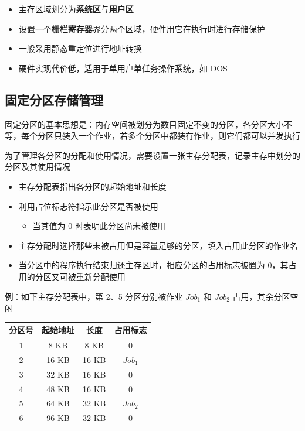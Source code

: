 \documentclass[cs4size,a4paper,10pt]{ctexart}
\begin{document}
	\begin{itemize}
		\item 主存区域划分为\textbf{系统区}与\textbf{用户区}
		\item 设置一个\textbf{栅栏寄存器}界分两个区域，硬件用它在执行时进行存储保护
		\item 一般采用静态重定位进行地址转换
		\item 硬件实现代价低，适用于单用户单任务操作系统，如 DOS
	\end{itemize}

	\subsection{固定分区存储管理}
	固定分区的基本思想是：内存空间被划分为数目固定不变的分区，各分区大小不等，每个分区只装入一个作业，若多个分区中都装有作业，则它们都可以并发执行

	为了管理各分区的分配和使用情况，需要设置一张主存分配表，记录主存中划分的分区及其使用情况
	\begin{itemize}
		\item 主存分配表指出各分区的起始地址和长度
		\item 利用占位标志符指示此分区是否被使用
		\begin{itemize}
			\item 当其值为 0 时表明此分区尚未被使用
		\end{itemize}
		\item 主存分配时选择那些未被占用但是容量足够的分区，填入占用此分区的作业名
		\item 当分区中的程序执行结束归还主存区时，相应分区的占用标志被置为 0，其占用的分区又可被重新分配使用
	\end{itemize}
	\textbf{例}：如下主存分配表中，第 2、5 分区分别被作业 $Job_1$ 和 $Job_2$ 占用，其余分区空闲
	\begin{table}[H]
		\centering
		\begin{tabular}{|c|c|c|c|}
		\hline
		分区号 & 起始地址  & 长度    & 占用标志    \\ \hline
		1   & 8 KB  & 8 KB  & 0       \\ \hline
		2   & 16 KB & 16 KB & $Job_1$ \\ \hline
		3   & 32 KB & 16 KB & 0       \\ \hline
		4   & 48 KB & 16 KB & 0       \\ \hline
		5   & 64 KB & 32 KB & $Job_2$ \\ \hline
		6   & 96 KB & 32 KB & 0       \\ \hline
		\end{tabular}
		\end{table}
\end{document}
